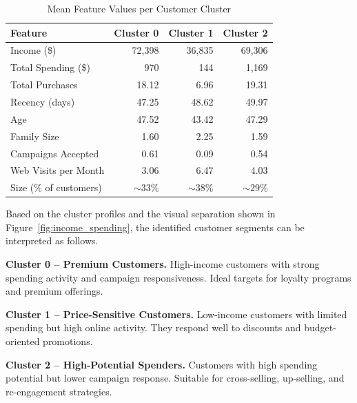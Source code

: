 \documentclass[twoside]{article}
\begin{document}
\begin{table}[htbp]
\centering
\caption{Mean Feature Values per Customer Cluster}
\label{tab:cluster_profile}
\footnotesize
\renewcommand{\arraystretch}{1.1}
\begin{tabular}{lrrr}
\hline
\textbf{Feature} &
\textbf{Cluster 0} &
\textbf{Cluster 1} &
\textbf{Cluster 2} \\
\hline

Income (\$)
& 72,398
& 36,835
& 69,306 \\

Total Spending (\$)
& 970
& 144
& 1,169 \\

Total Purchases
& 18.12
& 6.96
& 19.31 \\

Recency (days)
& 47.25
& 48.62
& 49.97 \\

Age
& 47.52
& 43.42
& 47.29 \\

Family Size
& 1.60
& 2.25
& 1.59 \\

Campaigns Accepted
& 0.61
& 0.09
& 0.54 \\

Web Visits per Month
& 3.06
& 6.47
& 4.03 \\

\hline

Size (\% of customers)
& \textit{\(\sim33\%\)}
& \textit{\(\sim38\%\)}
& \textit{\(\sim29\%\)} \\

\hline
\end{tabular}
\end{table}

Based on the cluster profiles and the visual separation shown in Figure~\ref{fig:income_spending}, the identified customer segments can be interpreted as follows.

\textbf{Cluster 0 -- Premium Customers.}  
High-income customers with strong spending activity and campaign responsiveness. Ideal targets for loyalty programs and premium offerings.

\textbf{Cluster 1 -- Price-Sensitive Customers.}  
Low-income customers with limited spending but high online activity. They respond well to discounts and budget-oriented promotions.

\textbf{Cluster 2 -- High-Potential Spenders.}  
Customers with high spending potential but lower campaign response. Suitable for cross-selling, up-selling, and re-engagement strategies.
\end{document}
